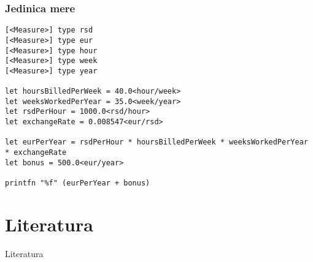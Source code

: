 \documentclass{beamer}
\begin{document}
\begin{frame}[fragile]
\frametitle{Jedinica mere}

\begin{lstlisting}
[<Measure>] type rsd
[<Measure>] type eur
[<Measure>] type hour
[<Measure>] type week
[<Measure>] type year

let hoursBilledPerWeek = 40.0<hour/week>
let weeksWorkedPerYear = 35.0<week/year>
let rsdPerHour = 1000.0<rsd/hour>
let exchangeRate = 0.008547<eur/rsd>

let eurPerYear = rsdPerHour * hoursBilledPerWeek * weeksWorkedPerYear * exchangeRate
let bonus = 500.0<eur/year>

printfn "%f" (eurPerYear + bonus)
\end{lstlisting}
\cite{progFs}
\end{frame}

\section{Literatura}

\begin{frame}{Literatura}



\end{frame}
\end{document}
